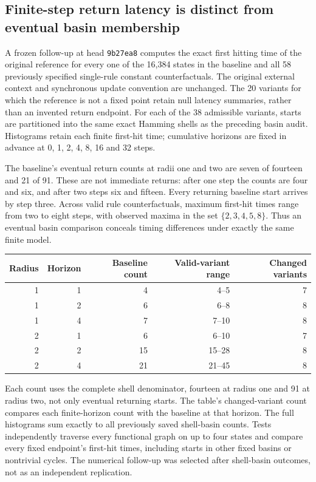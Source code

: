 \subsection{Finite-step return latency is distinct from eventual basin membership}
A frozen follow-up at head \texttt{9b27ea8} computes the exact first hitting time of the original reference for every one of the 16,384 states in the baseline and all 58 previously specified single-rule constant counterfactuals. The original external context and synchronous update convention are unchanged. The 20 variants for which the reference is not a fixed point retain null latency summaries, rather than an invented return endpoint. For each of the 38 admissible variants, starts are partitioned into the same exact Hamming shells as the preceding basin audit. Histograms retain each finite first-hit time; cumulative horizons are fixed in advance at 0, 1, 2, 4, 8, 16 and 32 steps.

The baseline's eventual return counts at radii one and two are seven of fourteen and 21 of 91. These are not immediate returns: after one step the counts are four and six, and after two steps six and fifteen. Every returning baseline start arrives by step three. Across valid rule counterfactuals, maximum first-hit times range from two to eight steps, with observed maxima in the set $\{2,3,4,5,8\}$. Thus an eventual basin comparison conceals timing differences under exactly the same finite model.

\begin{center}
\begin{tabular}{rrrrr}
\toprule
Radius & Horizon & Baseline count & Valid-variant range & Changed variants\\
\midrule
1 & 1 & 4 & 4--5 & 7\\
1 & 2 & 6 & 6--8 & 8\\
1 & 4 & 7 & 7--10 & 8\\
2 & 1 & 6 & 6--10 & 7\\
2 & 2 & 15 & 15--28 & 8\\
2 & 4 & 21 & 21--45 & 8\\
\bottomrule
\end{tabular}
\end{center}

Each count uses the complete shell denominator, fourteen at radius one and 91 at radius two, not only eventual returning starts. The table's changed-variant count compares each finite-horizon count with the baseline at that horizon. The full histograms sum exactly to all previously saved shell-basin counts. Tests independently traverse every functional graph on up to four states and compare every fixed endpoint's first-hit times, including starts in other fixed basins or nontrivial cycles. The numerical follow-up was selected after shell-basin outcomes, not as an independent replication.

